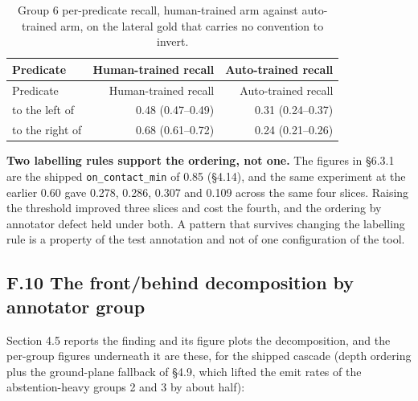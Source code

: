 \begin{center}
\setlength{\tabcolsep}{6pt}
\small
\begin{longtable}{lrr}
\caption[Group 6 per-predicate recall, human-trained arm]{Group 6 per-predicate recall, human-trained arm against auto-trained arm, on the lateral gold that carries no convention to invert.}\\
\hline
Predicate & Human-trained recall & Auto-trained recall \\
\hline
\endfirsthead
\hline
Predicate & Human-trained recall & Auto-trained recall \\
\hline
\endhead
to the left of & 0.48 (0.47--0.49) & 0.31 (0.24--0.37) \\
to the right of & 0.68 (0.61--0.72) & 0.24 (0.21--0.26) \\
\hline
\end{longtable}
\end{center}

\textbf{Two labelling rules support the ordering, not one.} The figures in \S{}6.3.1 are the shipped \texttt{on\_\allowbreak{}contact\_\allowbreak{}min} of 0.85 (\S{}4.14), and the same experiment at the earlier 0.60 gave 0.278, 0.286, 0.307 and 0.109 across the same four slices. Raising the threshold improved three slices and cost the fourth, and the ordering by annotator defect held under both. A pattern that survives changing the labelling rule is a property of the test annotation and not of one configuration of the tool.

\subsection{F.10 The front/behind decomposition by annotator group}

Section 4.5 reports the finding and its figure plots the decomposition, and the per-group figures underneath it are these, for the shipped cascade (depth ordering plus the ground-plane fallback of \S{}4.9, which lifted the emit rates of the abstention-heavy groups 2 and 3 by about half):

